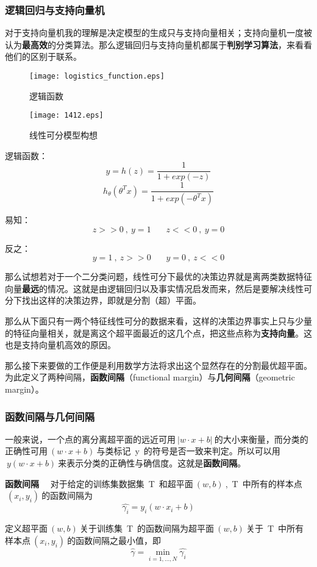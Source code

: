 \subsubsection{逻辑回归与支持向量机}
对于支持向量机我的理解是决定模型的生成只与支持向量相关；支持向量机一度被认为\textbf{最高效}的分类算法。那么逻辑回归与支持向量机都属于\textbf{判别学习算法}，来看看他们的区别于联系。
\begin{figure}[!htb]
  \centering
  \texttt{[image: logistics\_function.eps]}
  \caption{逻辑函数}
\end{figure}
\begin{figure}[!htb]
  \centering
  \texttt{[image: 1412.eps]}
  \caption{线性可分模型构想}
\end{figure}

逻辑函数：$$y=h(z)=\frac{1}{1+exp(-z)}$$$$h_\theta(\theta^T x)=\frac{1}{1+exp(-\theta^Tx)}$$

易知：$$z>>0~,~y=1~~~~~~~~z<<0~,~y=0$$



反之：$$y=1~,~z>>0~~~~~~~~y=0~,~z<<0$$

那么试想若对于一个二分类问题，线性可分下最优的决策边界就是离两类数据特征向量\textbf{最远}的情况。这就是由逻辑回归以及事实情况启发而来，然后是要解决线性可分下找出这样的决策边界，即就是分割（超）平面。

那么从下面只有一两个特征线性可分的数据来看，这样的决策边界事实上只与少量的特征向量相关，就是离这个超平面最近的这几个点，把这些点称为\textbf{支持向量}。这也是支持向量机高效的原因。

那么接下来要做的工作便是利用数学方法将求出这个显然存在的分割最优超平面。为此定义了两种间隔，\textbf{函数间隔}（functional margin）与\textbf{几何间隔}（geometric margin）。

\subsubsection{函数间隔与几何间隔}
一般来说，一个点的离分离超平面的远近可用$~|w\cdot x+b|~$的大小来衡量，而分类的正确性可用$~(w\cdot x+b)~$与类标记~y~的符号是否一致来判定。所以可以用$~y(w\cdot x+b)~$来表示分类的正确性与确信度。这就是\textbf{函数间隔}。

\textbf{函数间隔} ~~对于给定的训练集数据集~T~和超平面$~(w,b)~$,~T~中所有的样本点$~(x_i,y_i)~$的函数间隔为
$$\hat{\gamma_i}=y_i(w\cdot x_i+b)$$

定义超平面$~(w,b)~$关于训练集~T~的函数间隔为超平面$~(w,b)~$关于~T~中所有样本点$~(x_i,y_i)~$的函数间隔之最小值，即
$$\hat{\gamma} = \min \limits_{i=1,...,N} \hat{\gamma_i}$$



